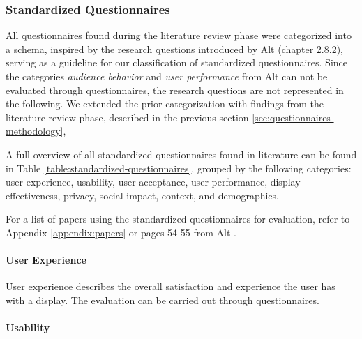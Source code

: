 




\subsubsection{Standardized Questionnaires}
\label{sec:questionnaires-categorization}



	All questionnaires found during the literature review phase were categorized into a schema, inspired by the research questions introduced by Alt \cite{alt2013thesis} (chapter 2.8.2), serving as a guideline for our classification of standardized questionnaires. Since the categories \textit{audience behavior} and \textit{user performance} from Alt can not be evaluated through questionnaires, the research questions are not represented in the following.
	We extended the prior categorization with findings from the literature review phase, described in the previous section \ref{sec:questionnaires-methodology}, 

	A full overview of all standardized questionnaires found in literature can be found in Table \ref{table:standardized-questionnaires}, grouped by the following categories: user experience, usability, user acceptance, user performance, display effectiveness, privacy, social impact, context, and demographics.

	For a list of papers using the standardized questionnaires for evaluation, refer to Appendix \ref{appendix:papers} or pages 54-55 from Alt \cite{alt2013thesis}.



	\paragraph{User Experience}

		User experience describes the overall satisfaction and experience the user has with a display. The evaluation can be carried out through questionnaires.
	
	\paragraph{Usability}

